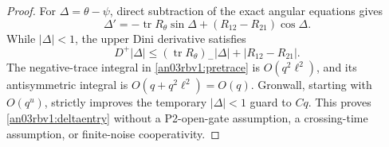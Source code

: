 \documentclass[11pt]{article}
\numberwithin{equation}{section}
\theoremstyle{remark}\newtheorem{remark}[theorem]{Remark}
\begin{document}
\begin{proof}
For $\Delta=\theta-\psi$, direct subtraction of the exact angular
equations gives
\begin{equation}
 \Delta'=-\operatorname{tr}R_\theta\sin\Delta
                +(R_{12}-R_{21})\cos\Delta.
 \label{an03rbv1:deltaequation}
\end{equation}
While $|\Delta|<1$, the upper Dini derivative satisfies
\begin{equation}
 D^+|\Delta|\le(\operatorname{tr}R_\theta)_-|\Delta|
                         +|R_{12}-R_{21}|.
 \label{an03rbv1:deltacomparison}
\end{equation}
The negative-trace integral in \eqref{an03rbv1:pretrace} is
$O(q^2\ell^2)$, and its antisymmetric integral is
$O(q+q^2\ell^2)=O(q)$. Gronwall, starting with $O(q^u)$,
strictly improves the temporary $|\Delta|<1$ guard to $Cq$.
This proves \eqref{an03rbv1:deltaentry} without a P2-open-gate
assumption, a crossing-time assumption, or finite-noise cooperativity.
\end{proof}
\end{document}
